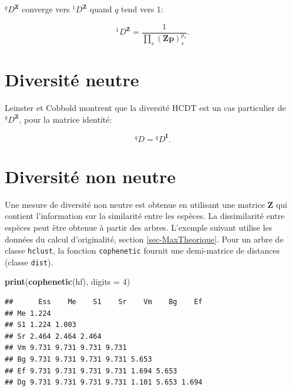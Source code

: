 \documentclass[
  11pt,
  french,
  a4paper,
  extrafontsizes,onecolumn,openright
  ]{memoir}
\newenvironment{Shaded}{\begin{snugshade}}{\end{snugshade}}
\newcommand{\AttributeTok}[1]{\textcolor[rgb]{0.13,0.29,0.53}{#1}}
\newcommand{\DecValTok}[1]{\textcolor[rgb]{0.00,0.00,0.81}{#1}}
\newcommand{\FunctionTok}[1]{\textcolor[rgb]{0.13,0.29,0.53}{\textbf{#1}}}
\newcommand{\NormalTok}[1]{#1}
\begin{document}
\(^q\!D^{\mathbf{Z}}\) converge vers \(^1\!D^{\mathbf{Z}}\) quand \(q\) tend vers 1:

\begin{equation}
  \label{eq:D1z}
  ^1\!D^{\mathbf{Z}} = \frac{1}{\prod_s{{\left(\mathbf{Zp}\right)}^{p_s}_s}}.
\end{equation}

\section{Diversité neutre}\label{diversituxe9-neutre}

Leinster et Cobbold montrent que la diversité HCDT est un cas particulier de \(^q\!D^{\mathbf{Z}}\), pour la matrice identité:

\begin{equation}
  \label{eq:DqI}
  ^{q}\!D={^q\!D^{\mathbf{I}}}.
\end{equation}

\section{Diversité non neutre}\label{diversituxe9-non-neutre}

Une mesure de diversité non neutre est obtenue en utilisant une matrice \(\mathbf{Z}\) qui contient l'information sur la similarité entre les espèces.
La dissimilarité entre espèces peut être obtenue à partir des arbres.
L'exemple suivant utilise les données du calcul d'originalité, section \ref{sec-MaxTheorique}.
Pour un arbre de classe \texttt{hclust}, la fonction \texttt{cophenetic} fournit une demi-matrice de distances (classe \texttt{dist}).

\scriptsize

\begin{Shaded}
\begin{Highlighting}[]
\FunctionTok{print}\NormalTok{(}\FunctionTok{cophenetic}\NormalTok{(hf), }\AttributeTok{digits =} \DecValTok{4}\NormalTok{)}
\end{Highlighting}
\end{Shaded}

\begin{verbatim}
##      Ess    Me    S1    Sr    Vm    Bg    Ef
## Me 1.224                                    
## S1 1.224 1.003                              
## Sr 2.464 2.464 2.464                        
## Vm 9.731 9.731 9.731 9.731                  
## Bg 9.731 9.731 9.731 9.731 5.653            
## Ef 9.731 9.731 9.731 9.731 1.694 5.653      
## Dg 9.731 9.731 9.731 9.731 1.101 5.653 1.694
\end{verbatim}
\end{document}
